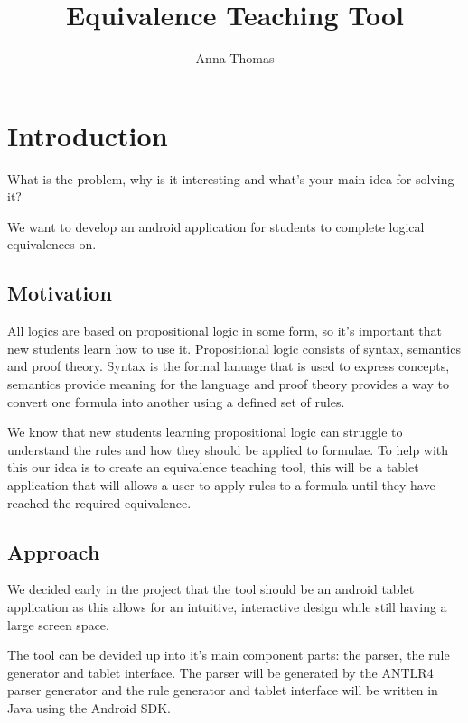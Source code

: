 \documentclass{report}
\begin{document}
 

\title{Equivalence Teaching Tool} 
\author{Anna Thomas} 

\maketitle 

\tableofcontents 

\chapter{Introduction} 

What is the problem, why is it interesting and what’s your main idea for solving it?

We want to develop an android application for students to complete logical equivalences on. 

\section{Motivation} 
All logics are based on propositional logic in some form, so it's important that new students learn how to use it. Propositional logic consists of syntax, semantics and proof theory. Syntax is the formal lanuage that is used to express concepts, semantics provide meaning for the language and proof theory provides a way to convert one formula into another using a defined set of rules.

We know that new students learning propositional logic can struggle to understand the rules and how they should be applied to formulae. To help with this our idea is to create an equivalence teaching tool, this will be a tablet application that will allows a user to apply rules to a formula until they have reached the required equivalence.

\section{Approach}

We decided early in the project that the tool should be an android tablet application as this allows for an intuitive, interactive design while still having a large screen space.

The tool can be devided up into it's main component parts: the parser, the rule generator and tablet interface. The parser will be generated by the ANTLR4 parser generator and the rule generator and tablet interface will be written in Java using the Android SDK.
\end{document}

